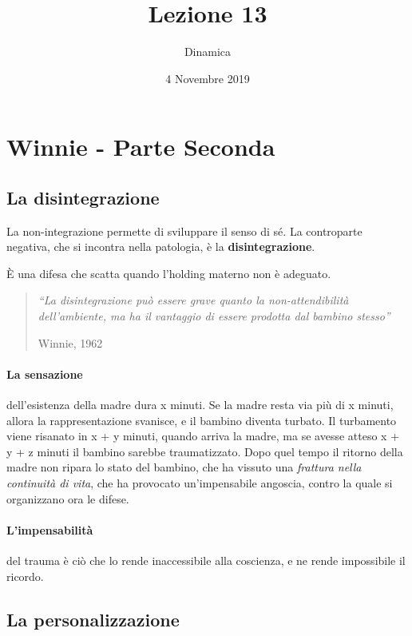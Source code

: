 \documentclass[12pt, a4paper]{article}
\date{4 Novembre 2019}
\title{Lezione 13}
\author{Dinamica}
\begin{document}
\maketitle


\section{Winnie - Parte Seconda}

\subsection{La disintegrazione}

La non-integrazione permette di sviluppare il senso di s\'e. La controparte negativa, che si incontra nella patologia, \`e la \textbf{disintegrazione}.

\`E una difesa che scatta quando l'holding materno non \`e adeguato.

\begin{quote}
    \emph{``La disintegrazione può essere grave quanto la non-attendibilit\`a dell'ambiente, ma ha il vantaggio di essere prodotta dal bambino stesso''}
    \begin{flushright}
        Winnie, 1962
    \end{flushright}
\end{quote}

\paragraph{La sensazione} dell'esistenza della madre dura x minuti. Se la madre resta via pi\`u di x minuti, allora la rappresentazione svanisce, e il bambino diventa turbato. Il turbamento viene risanato in x + y minuti, quando arriva la madre, ma se avesse atteso x + y + z minuti il bambino sarebbe traumatizzato. Dopo quel tempo il ritorno della madre non ripara lo stato del bambino, che ha vissuto una \emph{frattura nella continuit\`a di vita}, che ha provocato
un'impensabile angoscia, contro la quale si organizzano ora le difese.

\paragraph{L'impensabilit\`a} del trauma \`e ciò che lo rende inaccessibile alla coscienza, e ne rende impossibile il ricordo.

\subsection{La personalizzazione}
\end{document}
